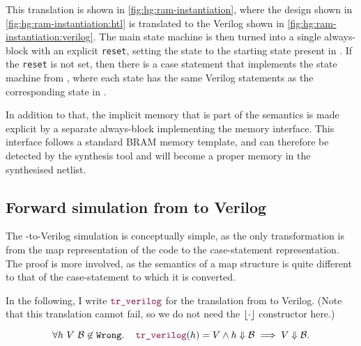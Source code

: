 This translation is shown in \cref{fig:hg:ram-instantiation}, where the \htl{}
design shown in \cref{fig:hg:ram-instantiation:htl} is translated to the Verilog
shown in \cref{fig:hg:ram-instantiation:verilog}.  The main state machine is
then turned into a single always-block with an explicit \texttt{reset}, setting
the state to the starting state present in \htl{}.  If the \texttt{reset} is not
set, then there is a case statement that implements the state machine from
\htl{}, where each state has the same Verilog statements as the corresponding
state in \htl{}.

In addition to that, the implicit memory that is part of the \htl{} semantics is
made explicit by a separate always-block implementing the memory interface.
This interface follows a standard \gls{BRAM} memory template, and can therefore
be detected by the synthesis tool and will become a proper memory in the
synthesised netlist.

\subsection{Forward simulation from \htl{} to Verilog}%
\label{sec:proof:htl_verilog}

The \htl{}-to-Verilog simulation is conceptually simple, as the only
transformation is from the map representation of the code to the case-statement
representation.  The proof is more involved, as the semantics of a map structure
is quite different to that of the case-statement to which it is converted.

\begin{lemma}\label{lemma:verilog}
  In the following, I write {\normalfont $\yhfunction{tr\_verilog}$} for the translation from
  \htl{} to Verilog. (Note that this translation cannot fail, so we do not need
  the $\lfloor \cdot \rfloor$ constructor here.)

  {\normalfont
    \begin{equation}
      \forall h\ V\ \mathcal{B} \not\in \texttt{Wrong}\ldotp\quad \yhfunction{tr\_verilog} (h) = V \land h \Downarrow \mathcal{B} \implies V \Downarrow \mathcal{B}.
    \end{equation}}
\end{lemma}

